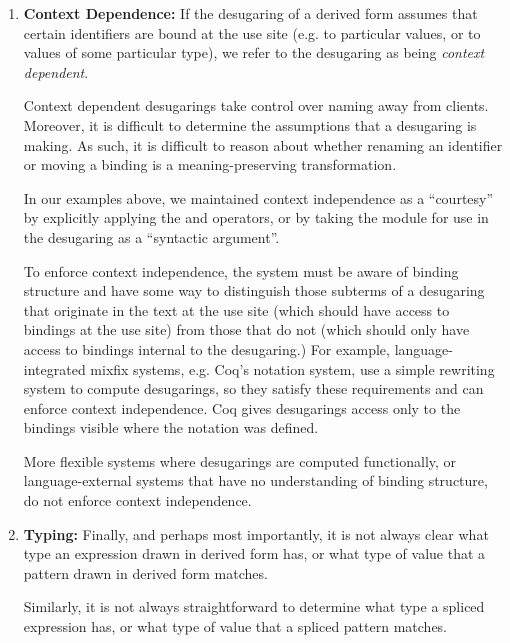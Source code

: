 {\begin{enumerate}
\item \textbf{Context Dependence:} If the desugaring of a derived form assumes that certain identifiers are bound at the use site (e.g. to particular values, or to values of some particular type), we refer to the desugaring as being \emph{context dependent}. 


Context dependent desugarings take control over naming away from clients. Moreover, it is difficult to determine the assumptions that a desugaring is making. As such, it is difficult to reason about whether renaming an identifier or moving a binding is a meaning-preserving transformation. 

In our examples above, we maintained context independence as a ``courtesy'' by explicitly applying the  and  operators, or by taking the module for use in the desugaring as a ``syntactic argument''. 

To enforce context independence, the system must be aware of binding structure and have some way to distinguish those subterms of a desugaring that originate in the text at the use site (which should have access to bindings at the use site) from those that do not (which should only have access to bindings internal to the desugaring.) 
For example, language-integrated mixfix systems, e.g. Coq's notation system, use a simple rewriting system to compute desugarings, so they satisfy these requirements and can enforce context independence. Coq gives desugarings access only to the bindings visible where the notation was defined.

More flexible systems where desugarings are computed functionally, or language-external systems that have no understanding of binding structure, do not enforce context independence.

\item \textbf{Typing:} Finally, and perhaps most importantly, it is not always clear what type an expression drawn in derived form has, or what type of value that a pattern drawn in derived form matches.

Similarly, it is not always straightforward to determine what type a spliced expression has, or what type of value that a spliced pattern matches.


\end{enumerate}}
